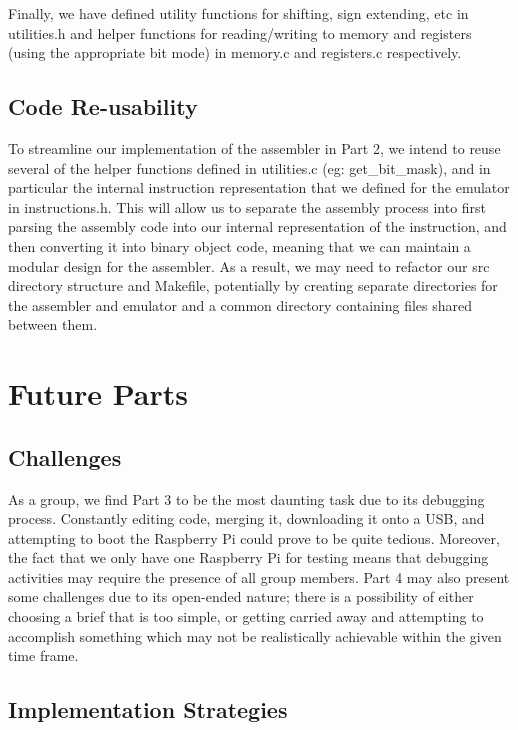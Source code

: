 \documentclass{article}
\begin{document}
Finally, we have defined utility functions for shifting, sign extending, etc in
utilities.h and helper functions for reading/writing to memory and registers
(using the appropriate bit mode) in memory.c and registers.c respectively.

\subsection{Code Re-usability}

To streamline our implementation of the assembler in Part 2, we intend to reuse
several of the helper functions defined in utilities.c (eg: get\_bit\_mask), and
in particular the internal instruction representation that we defined for the
emulator in instructions.h. This will allow us to separate the assembly process
into first parsing the assembly code into our internal representation of the
instruction, and then converting it into binary object code, meaning that we can
maintain a modular design for the assembler. As a result, we may need to
refactor our src directory structure and Makefile, potentially by creating
separate directories for the assembler and emulator and a common directory
containing files shared between them.

\section{Future Parts}

\subsection{Challenges}

As a group, we find Part 3 to be the most daunting task due to its debugging
process. Constantly editing code, merging it, downloading it onto a USB, and
attempting to boot the Raspberry Pi could prove to be quite tedious. Moreover,
the fact that we only have one Raspberry Pi for testing means that debugging
activities may require the presence of all group members. Part 4 may also
present some challenges due to its open-ended nature; there is a possibility of
either choosing a brief that is too simple, or getting carried away and
attempting to accomplish something which may not be realistically achievable
within the given time frame.

\subsection{Implementation Strategies}
\end{document}
